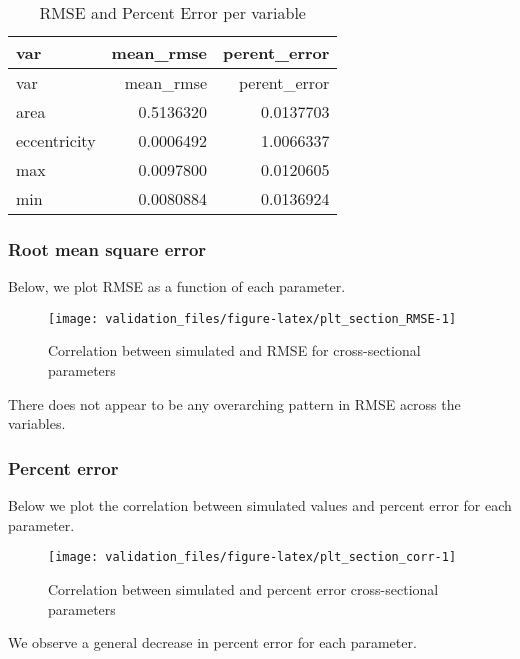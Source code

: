 \documentclass[
]{article}
\begin{document}
\begin{longtable}[]{@{}lrr@{}}
\caption{RMSE and Percent Error per variable}\tabularnewline
\toprule
var & mean\_rmse & perent\_error\tabularnewline
\midrule
\endfirsthead
\toprule
var & mean\_rmse & perent\_error\tabularnewline
\midrule
\endhead
area & 0.5136320 & 0.0137703\tabularnewline
eccentricity & 0.0006492 & 1.0066337\tabularnewline
max & 0.0097800 & 0.0120605\tabularnewline
min & 0.0080884 & 0.0136924\tabularnewline
\bottomrule
\end{longtable}

\hypertarget{root-mean-square-error-1}{%
\subsubsection{Root mean square error}\label{root-mean-square-error-1}}

Below, we plot RMSE as a function of each parameter.

\begin{figure}
\texttt{[image: validation\_files/figure-latex/plt\_section\_RMSE-1]} \caption{Correlation between simulated and RMSE for cross-sectional parameters}\label{fig:plt_section_RMSE}
\end{figure}

There does not appear to be any overarching pattern in RMSE across the
variables.

\hypertarget{percent-error-1}{%
\subsubsection{Percent error}\label{percent-error-1}}

Below we plot the correlation between simulated values and percent error
for each parameter.

\begin{figure}
\texttt{[image: validation\_files/figure-latex/plt\_section\_corr-1]} \caption{Correlation between simulated and percent error cross-sectional parameters}\label{fig:plt_section_corr}
\end{figure}

We observe a general decrease in percent error for each parameter.
\end{document}

